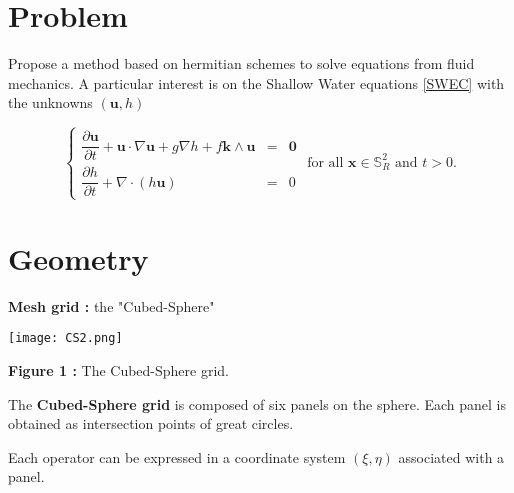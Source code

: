 \documentclass{sciposter}
\begin{document}
\begin{multicols}{2} %

\section{Problem}
   Propose a method based on hermitian schemes to solve equations from fluid mechanics. A particular interest is on the Shallow Water equations \eqref{SWEC} with the unknowns $(\mathbf{u},h)$

\begin{equation}
  \label{SWEC}
  \left\lbrace
  \begin{array}{rcl}
  \dfrac{\partial \mathbf{u}}{\partial t} + \mathbf{u} \cdot \nabla \mathbf{u} + g \nabla h + f \mathbf{k} \wedge \mathbf{u} & = & \mathbf{0} \\
  \dfrac{\partial h}{\partial t} + \nabla \cdot \left( h \mathbf{u} \right) & = & 0
  \end{array}
  \right.\text{ for all } \mathbf{x} \in \mathbb{S}_R^2 \text{ and } t>0.
\end{equation}


\section{Geometry}
\textbf{Mesh grid : } the "Cubed-Sphere"

\begin{center}
\texttt{[image: CS2.png]}

\textbf{Figure 1 :} The Cubed-Sphere grid.
\end{center}

The \textbf{Cubed-Sphere grid} is composed of six panels on the sphere. Each panel is obtained as intersection points of great circles.

Each operator can be expressed in a coordinate system $(\xi,\eta)$ associated with a panel.


\end{multicols}
\end{document}
